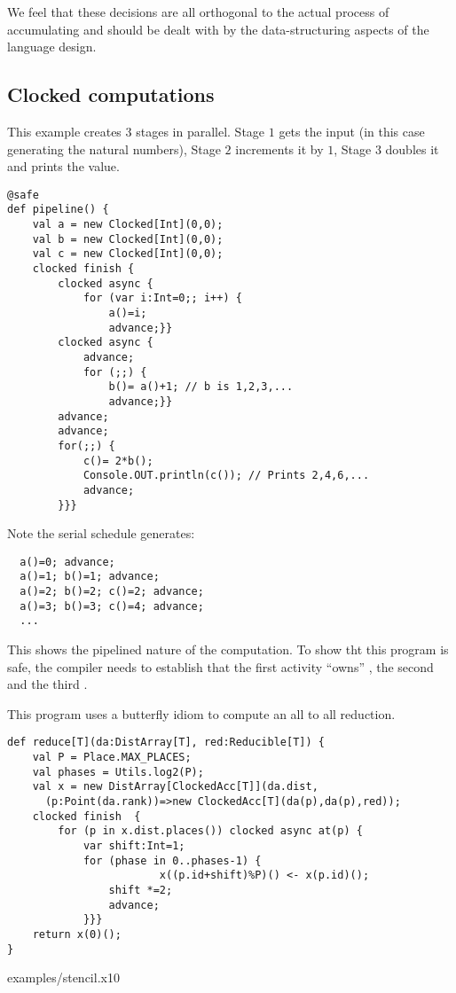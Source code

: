 We feel that these decisions are all orthogonal to the actual process
of accumulating and should be dealt with by the data-structuring
aspects of the language design.

\subsection{Clocked computations}

\begin{example}[Pipeline]
This example creates $3$ stages in parallel. Stage $1$ gets the input
(in this case generating the natural numbers), Stage $2$ increments it
by $1$, Stage $3$ doubles it and prints the value.
\begin{lstlisting}
@safe
def pipeline() {
    val a = new Clocked[Int](0,0);
    val b = new Clocked[Int](0,0);
    val c = new Clocked[Int](0,0);
    clocked finish {
        clocked async {
            for (var i:Int=0;; i++) {
                a()=i;
                advance;}}
        clocked async {
            advance;
            for (;;) {
                b()= a()+1; // b is 1,2,3,...
                advance;}}
        advance;
        advance;
        for(;;) {
            c()= 2*b();
            Console.OUT.println(c()); // Prints 2,4,6,...
            advance;
        }}}
  \end{lstlisting}
Note the serial schedule generates:
\begin{lstlisting}
  a()=0; advance;
  a()=1; b()=1; advance;
  a()=2; b()=2; c()=2; advance;
  a()=3; b()=3; c()=4; advance;
  ...
\end{lstlisting}
\noindent This shows the pipelined nature of the computation. To show
tht this program is safe, the compiler needs to establish that the
first activity ``owns'' , the second  and the third .
\end{example}

\begin{example}
This program uses a butterfly idiom to compute an all to all
reduction.
\begin{lstlisting}
def reduce[T](da:DistArray[T], red:Reducible[T]) {
    val P = Place.MAX_PLACES;
    val phases = Utils.log2(P);
    val x = new DistArray[ClockedAcc[T]](da.dist,
      (p:Point(da.rank))=>new ClockedAcc[T](da(p),da(p),red));
    clocked finish  {
        for (p in x.dist.places()) clocked async at(p) {
            var shift:Int=1;
            for (phase in 0..phases-1) {
                        x((p.id+shift)%P)() <- x(p.id)();
                shift *=2;
                advance;
            }}}
    return x(0)();
}
\end{lstlisting}
\end{example}

 {examples/stencil.x10}
